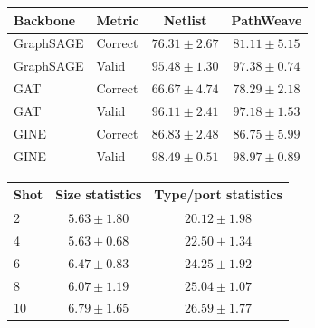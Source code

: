 \begin{tabular}{llcc}
\hline
Backbone & Metric & Netlist & PathWeave \\
\hline
GraphSAGE & Correct & $76.31 \pm 2.67$ & $81.11 \pm 5.15$ \\
GraphSAGE & Valid & $95.48 \pm 1.30$ & $97.38 \pm 0.74$ \\
GAT & Correct & $66.67 \pm 4.74$ & $78.29 \pm 2.18$ \\
GAT & Valid & $96.11 \pm 2.41$ & $97.18 \pm 1.53$ \\
GINE & Correct & $86.83 \pm 2.48$ & $86.75 \pm 5.99$ \\
GINE & Valid & $98.49 \pm 0.51$ & $98.97 \pm 0.89$ \\
\hline
\end{tabular}

\begin{tabular}{lcc}
\hline
Shot & Size statistics & Type/port statistics \\
\hline
2 & $5.63 \pm 1.80$ & $20.12 \pm 1.98$ \\
4 & $5.63 \pm 0.68$ & $22.50 \pm 1.34$ \\
6 & $6.47 \pm 0.83$ & $24.25 \pm 1.92$ \\
8 & $6.07 \pm 1.19$ & $25.04 \pm 1.07$ \\
10 & $6.79 \pm 1.65$ & $26.59 \pm 1.77$ \\
\hline
\end{tabular}
